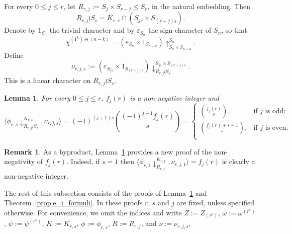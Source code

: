 \documentclass[10pt]{article}
\newtheorem{lemma}[theorem]{Lemma}
\theoremstyle{definition}
\newtheorem{remark}[theorem]{Remark}
\begin{document}
For every $0\leq j\leq r$, let 
$R_{r,j} := S_j \times S_{r-j} \le S_r$, in the natural embedding. Then
\[
    R_{r,j} \wr S_s
    = K_{r,s} \cap \left( S_{js} \times S_{(r-j)s} \right).
\]
Denote by $1_{S_n}$ the trivial character and by $\varepsilon_{S_n}$ the sign character of $S_n$, so that
\[
    \chi^{(1^k)\oplus(n-k)}=(\varepsilon_{S_{k}}\times 1_{S_{n-k}})\uparrow_{S_k \times S_{n-k}}^{S_n}.
\]
Define
\[
    \nu_{r,j,s} := (\varepsilon_{S_{js}} \times 1_{S_{(r-j)s}}) \downarrow_{R_{r,j}\wr S_s}^{S_{js} \times S_{(r-j)s}}.
\]
This is a linear character on $R_{r,j} \wr S_s$.
	
\begin{lemma}\label{lem:char_values_and_inner_product}
    For every $0\le j\le r$,
    $f_j(r)$ is a non-negative integer and 
    \[
        \langle \phi_{r,s}\downarrow_{R_{r,j}\wr S_{s}}^{K_{r,s}},\nu_{r,j,s} \rangle 
        = (-1)^{(j+1)s} \binom{(-1)^{j+1} f_j(r)}{s}
        = \begin{cases}
            \binom{f_j(r)}{s}, &\text{if } j \text{ is odd;}\\
            \binom{f_j(r)+s-1}{s}, &\text{if } j \text{ is even.}\\
        \end{cases}
    \]
\end{lemma}
		
\begin{remark}
    As a byproduct, Lemma~\ref{lem:char_values_and_inner_product}
    provides a new proof of the non-negativity of $f_j(r)$.
    Indeed, if $s=1$ then 
    $\langle \phi_{r,1} \downarrow_{R_{r,j}}^{K_{r,1}},\nu_{r,j,1} \rangle = f_j(r)$ 
    is clearly a non-negative integer.
\end{remark}	
	
The rest of this subsection consists of the proofs of Lemma~\ref{lem:char_values_and_inner_product} 
and Theorem~\ref{prop:e_i_formuli}. 
In these proofs 
$r$, $s$ and $j$ are fixed, unless specified otherwise. 
For convenience, we omit the indices and write 
$Z := Z_{(r^s)}$, 
$\omega := \omega^{(r^s)}$, 
$\psi := \psi^{(r^s)}$, 
$K := K_{r,s}$, 
$\phi := \phi_{r,s}$, 
$R := R_{r,j}$, and
$\nu := \nu_{r,j,s}$, 
\end{document}
